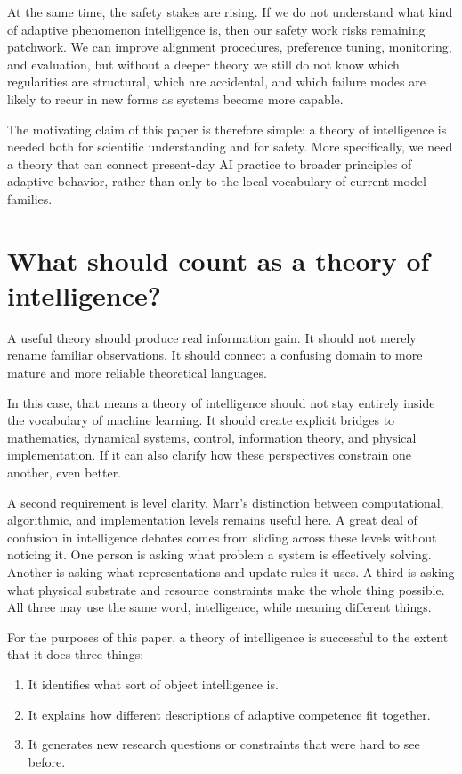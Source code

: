 \documentclass[11pt]{article}
\begin{document}
At the same time, the safety stakes are rising. If we do not understand what kind of adaptive phenomenon intelligence is, then our safety work risks remaining patchwork. We can improve alignment procedures, preference tuning, monitoring, and evaluation, but without a deeper theory we still do not know which regularities are structural, which are accidental, and which failure modes are likely to recur in new forms as systems become more capable.

The motivating claim of this paper is therefore simple: a theory of intelligence is needed both for scientific understanding and for safety. More specifically, we need a theory that can connect present-day AI practice to broader principles of adaptive behavior, rather than only to the local vocabulary of current model families.

\section{What should count as a theory of intelligence?}

A useful theory should produce real information gain. It should not merely rename familiar observations. It should connect a confusing domain to more mature and more reliable theoretical languages.

In this case, that means a theory of intelligence should not stay entirely inside the vocabulary of machine learning. It should create explicit bridges to mathematics, dynamical systems, control, information theory, and physical implementation. If it can also clarify how these perspectives constrain one another, even better.

A second requirement is level clarity. Marr's distinction between computational, algorithmic, and implementation levels remains useful here. A great deal of confusion in intelligence debates comes from sliding across these levels without noticing it. One person is asking what problem a system is effectively solving. Another is asking what representations and update rules it uses. A third is asking what physical substrate and resource constraints make the whole thing possible. All three may use the same word, intelligence, while meaning different things.

For the purposes of this paper, a theory of intelligence is successful to the extent that it does three things:

\begin{enumerate}
\item It identifies what sort of object intelligence is.
\item It explains how different descriptions of adaptive competence fit together.
\item It generates new research questions or constraints that were hard to see before.
\end{enumerate}
\end{document}
